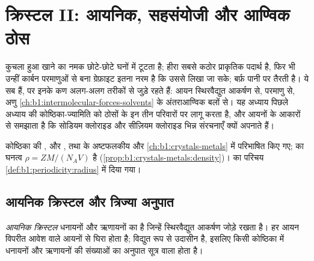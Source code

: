 \chapter{क्रिस्टल II: आयनिक, सहसंयोजी और आण्विक ठोस}\label{ch:b1:crystals-ionic-covalent}

कुचला हुआ खाने का नमक छोटे-छोटे घनों में टूटता है; हीरा सबसे कठोर
प्राकृतिक पदार्थ है, फिर भी उन्हीं कार्बन परमाणुओं से बना ग्रेफ़ाइट इतना नरम है
कि उससे लिखा जा सके; बर्फ़ पानी पर तैरती है। ये सब  हैं, पर इनके
कण अलग-अलग तरीकों से जुड़े रहते हैं: आयन स्थिरवैद्युत
आकर्षण से, परमाणु  से, अणु \cref{ch:b1:intermolecular-forces-solvents}
के अंतराआण्विक बलों से। यह अध्याय
पिछले अध्याय की कोष्ठिका-ज्यामिति को ठोसों के इन तीन परिवारों पर लागू करता है,
और आयनों के आकारों से समझाता है कि सोडियम क्लोराइड
और सीज़ियम क्लोराइड भिन्न संरचनाएँ क्यों अपनाते हैं।

\begin{recall}
कोष्ठिका की ,  और , तथा
  के अष्टफलकीय और 
\cref{ch:b1:crystals-metals} में परिभाषित किए गए;  का घनत्व
$\rho = ZM/(N_A V)$ है (\cref{prop:b1:crystals-metals:density})।  का
परिचय \cref{def:b1:periodicity:radius} में दिया गया।
\end{recall}

\section{आयनिक क्रिस्टल और त्रिज्या अनुपात}

\begin{definition}[आयनिक क्रिस्टल]\label{def:b1:crystals-ionic-covalent:ionic-crystal}
\emph{आयनिक क्रिस्टल} धनायनों और
ऋणायनों का  है जिन्हें स्थिरवैद्युत आकर्षण जोड़े रखता है। हर आयन विपरीत आवेश
वाले आयनों से घिरा होता है;  विद्युत रूप से उदासीन है, इसलिए
किसी कोष्ठिका में धनायनों और ऋणायनों की संख्याओं का अनुपात सूत्र वाला होता है।
\end{definition}


